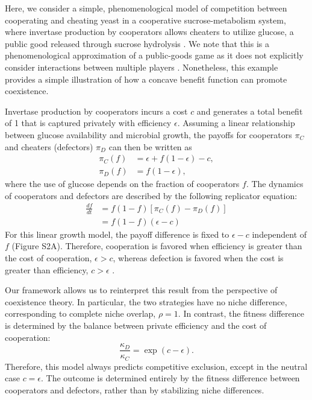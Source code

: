 \documentclass[12pt]{article}
\begin{document}
Here, we consider a simple, phenomenological model of competition between cooperating and cheating yeast in a cooperative sucrose-metabolism system, where invertase production by cooperators allows cheaters to utilize glucose, a public good released through sucrose hydrolysis \citep{carlson1982two,dickinson1998metabolism,gore2009snowdrift}.
We note that this is a phenomenological approximation of a public-goods game as it does not explicitly consider interactions between multiple players \citep{archetti2012game}.
Nonetheless, this example provides a simple illustration of how a concave benefit function can promote coexistence.

Invertase production by cooperators incurs a cost $c$ and generates a total benefit of 1 that is captured privately with efficiency $\epsilon$. 
Assuming a linear relationship between glucose availability and microbial growth, the payoffs for cooperators $\pi_C$ and cheaters (defectors) $\pi_D$ can then be written as
\begin{align}
\pi_C(f) &= \epsilon + f (1-\epsilon) - c,\\
\pi_D(f) &= f (1-\epsilon),
\end{align}
where the use of glucose depends on the fraction of cooperators $f$. 
The dynamics of cooperators and defectors are described by the following replicator equation:
\begin{align}
\frac{df}{dt} &= f(1-f)\left[\pi_C(f)-\pi_D(f)\right]\\
&= f(1-f)(\epsilon - c)
\end{align}
For this linear growth model, the payoff difference is fixed to $\epsilon-c$ independent of $f$ (Figure S2A).
Therefore, cooperation is favored when efficiency is greater than the cost of cooperation, $\epsilon > c$, whereas defection is favored when the cost is greater than efficiency, $c > \epsilon$ \citep{gore2009snowdrift}.

Our framework allows us to reinterpret this result from the perspective of coexistence theory. 
In particular, the two strategies have no niche difference, corresponding to complete niche overlap, $\rho = 1$. 
In contrast, the fitness difference is determined by the balance between private efficiency and the cost of cooperation:
\begin{equation}
\frac{\kappa_D}{\kappa_C} = \exp(c - \epsilon).
\end{equation}
Therefore, this model always predicts competitive exclusion, except in the neutral case $c=\epsilon$. 
The outcome is determined entirely by the fitness difference between cooperators and defectors, rather than by stabilizing niche differences.
\end{document}
